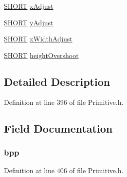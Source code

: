 \begin{DoxyCompactItemize}
\item 
\hyperlink{_generic_type_defs_8h_ae9bb25d3afecf3bfab0fbe3c22c2050f}{S\+H\+O\+R\+T} \hyperlink{struct_o_u_t_c_h_a_r___p_a_r_a_m_a4b7e678aa4ba85c4eed9db0690b92766}{x\+Adjust}
\item 
\hyperlink{_generic_type_defs_8h_ae9bb25d3afecf3bfab0fbe3c22c2050f}{S\+H\+O\+R\+T} \hyperlink{struct_o_u_t_c_h_a_r___p_a_r_a_m_a0e14b49125d3870244e6ace48f934415}{y\+Adjust}
\item 
\hyperlink{_generic_type_defs_8h_ae9bb25d3afecf3bfab0fbe3c22c2050f}{S\+H\+O\+R\+T} \hyperlink{struct_o_u_t_c_h_a_r___p_a_r_a_m_a310f15171b86366695ce6b3ab5c86204}{x\+Width\+Adjust}
\item 
\hyperlink{_generic_type_defs_8h_ae9bb25d3afecf3bfab0fbe3c22c2050f}{S\+H\+O\+R\+T} \hyperlink{struct_o_u_t_c_h_a_r___p_a_r_a_m_a03244b58902ce255eb3894328c3e0b92}{height\+Overshoot}
\end{DoxyCompactItemize}


\subsection{Detailed Description}


Definition at line 396 of file Primitive.\+h.



\subsection{Field Documentation}
\hypertarget{struct_o_u_t_c_h_a_r___p_a_r_a_m_af02776c3f111a79a638c5de8c5cc4f40}{}
\subsubsection[{bpp}]{ bpp}\label{struct_o_u_t_c_h_a_r___p_a_r_a_m_af02776c3f111a79a638c5de8c5cc4f40}


Definition at line 406 of file Primitive.\+h.

\hypertarget{struct_o_u_t_c_h_a_r___p_a_r_a_m_a11dc54b7351d032f72bd9b5eaf8382ee}{}
